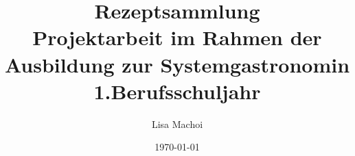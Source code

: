 \documentclass[10pt,a4paper]{article}
\begin{document}
\thispagestyle{empty}
\title{Rezeptsammlung\\
	\vspace{1cm}
	{\large Projektarbeit im Rahmen der Ausbildung zur Systemgastronomin}\\
	{\small 1.Berufsschuljahr}
	\vspace{2cm}
}
\author{Lisa Machoi}
\date{\today}
\maketitle
\newpage
\thispagestyle{empty}
\tableofcontents
\setcounter{page}{0}
%
\newpage
\setcounter{page}{1}


























\end{document}
